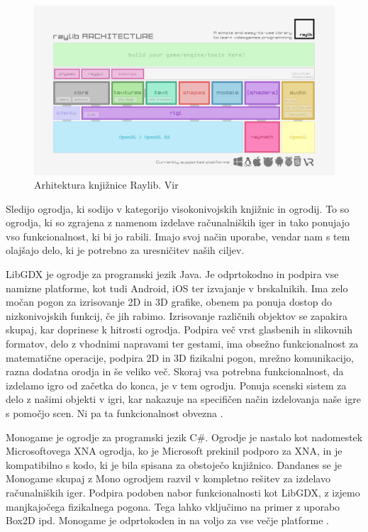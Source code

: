 \documentclass[12pt,a4paper,twoside]{book}
\begin{document}
\begin{figure}[h]
	\centering
	\includegraphics[width=12cm]{raylib_architecture}
	\caption{Arhitektura knjižnice Raylib. Vir \cite{raylib}}
	\label{slika:raylib}
\end{figure}

Sledijo ogrodja, ki sodijo v kategorijo visokonivojskih knjižnic in ogrodij. To so ogrodja, ki so zgrajena z namenom izdelave računalniških iger in tako ponujajo vso funkcionalnost, ki bi jo rabili. Imajo svoj način uporabe, vendar nam s tem olajšajo delo, ki je potrebno za uresničitev naših ciljev.

LibGDX je ogrodje za programski jezik Java. Je odprtokodno in podpira vse namizne platforme, kot tudi Android, iOS ter izvajanje v brskalnikih. Ima zelo močan pogon za izrisovanje 2D in 3D grafike, obenem pa ponuja dostop do nizkonivojskih funkcij, če jih rabimo. Izrisovanje različnih objektov se zapakira skupaj, kar doprinese k hitrosti ogrodja. Podpira več vrst glasbenih in slikovnih formatov, delo z vhodnimi napravami ter gestami, ima obsežno funkcionalnost za matematične operacije, podpira 2D in 3D fizikalni pogon, mrežno komunikacijo, razna dodatna orodja in še veliko več. Skoraj vsa potrebna funkcionalnost, da izdelamo igro od začetka do konca, je v tem ogrodju. Ponuja scenski sistem za delo z našimi objekti v igri, kar nakazuje na specifičen način izdelovanja naše igre s pomočjo scen. Ni pa ta funkcionalnost obvezna \cite{libgdx}.

Monogame je ogrodje za programski jezik C\#. Ogrodje je nastalo kot nadomestek Microsoftovega XNA ogrodja, ko je Microsoft prekinil podporo za XNA, in je kompatibilno s kodo, ki je bila spisana za obstoječo knjižnico. Dandanes se je Monogame skupaj z Mono ogrodjem razvil v kompletno rešitev za izdelavo računalniških iger. Podpira podoben nabor funkcionalnosti kot LibGDX, z izjemo manjkajočega fizikalnega pogona. Tega lahko vključimo na primer z uporabo Box2D ipd. Monogame je odprtokoden in na voljo za vse večje platforme \cite{monogame}.
\end{document}
